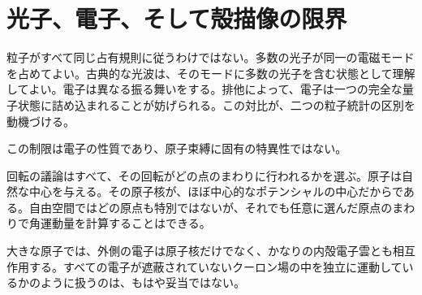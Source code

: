 \section{光子、電子、そして殻描像の限界}

粒子がすべて同じ占有規則に従うわけではない。多数の光子が同一の電磁モードを占めてよい。古典的な光波は、そのモードに多数の光子を含む状態として理解してよい。電子は異なる振る舞いをする。排他によって、電子は一つの完全な量子状態に詰め込まれることが妨げられる。この対比が、二つの粒子統計の区別を動機づける。

\begin{classroomqa}
\end{classroomqa}

この制限は電子の性質であり、原子束縛に固有の特異性ではない。

\begin{classroomqa}
\end{classroomqa}

回転の議論はすべて、その回転がどの点のまわりに行われるかを選ぶ。原子は自然な中心を与える。その原子核が、ほぼ中心的なポテンシャルの中心だからである。自由空間ではどの原点も特別ではないが、それでも任意に選んだ原点のまわりで角運動量を計算することはできる。

\begin{classroomqa}
\end{classroomqa}


大きな原子では、外側の電子は原子核だけでなく、かなりの内殻電子雲とも相互作用する。すべての電子が遮蔽されていないクーロン場の中を独立に運動しているかのように扱うのは、もはや妥当ではない。

\begin{classroomqa}
\end{classroomqa}

